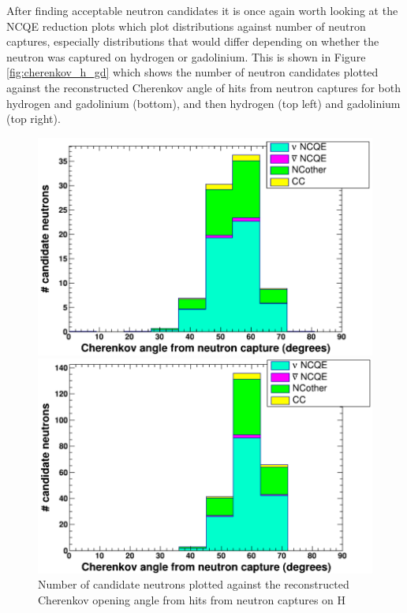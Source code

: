 After finding acceptable neutron candidates it is once again worth looking at the NCQE reduction plots which plot distributions against number of neutron captures, especially distributions that would differ depending on whether the neutron was captured on hydrogen or gadolinium. This is shown in Figure \ref{fig:cherenkov_h_gd} which shows the number of neutron candidates plotted against the reconstructed Cherenkov angle of hits from neutron captures for both hydrogen and gadolinium (bottom), and then hydrogen (top left) and gadolinium (top right).


\begin{figure}[htp]%
    \centering
    \begin{minipage}{0.49\textwidth}
    \includegraphics[width=\textwidth]{Figures/cherenkov_angle_neutron_capture_H.png}
    \caption{Number of candidate neutrons plotted against the reconstructed Cherenkov opening angle from hits from neutron captures on H}
    \end{minipage}\hfill
    \begin{minipage}{0.49\textwidth}
    \includegraphics[width=\textwidth]{Figures/cherenkov_angle_neutron_capture_Gd.png}

\end{minipage}
\end{figure}
